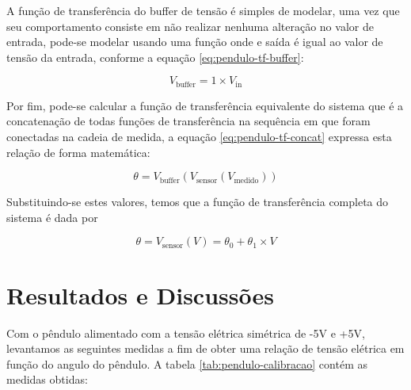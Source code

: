 \documentclass[12pt,a4paper]{instrumentacao}
\begin{document}
A função de transferência do buffer de tensão é simples de modelar, uma vez que seu comportamento consiste em não realizar nenhuma alteração no valor de entrada, pode-se modelar usando uma função onde e saída é igual ao valor de tensão da entrada, conforme a equação \ref{eq:pendulo-tf-buffer}:

\begin{equation}
	V_{\text{buffer}} = 1 \times V_{\text{in}}	
	\label{eq:pendulo-tf-buffer}
\end{equation}


Por fim, pode-se calcular a função de transferência equivalente do sistema que é a concatenação de todas funções de transferência na sequência em que foram conectadas na cadeia de medida, a equação \ref{eq:pendulo-tf-concat} expressa esta relação de forma matemática:

\begin{equation}
	\theta = V_{\text{buffer}}(V_{\text{sensor}}(V_{\text{medido}}))
	\label{eq:pendulo-tf-concat}
\end{equation}

Substituindo-se estes valores, temos que a função de transferência completa do sistema é dada por \label{eq:pendulo-tf-bloco}

\begin{equation}
	\theta = V_{\text{sensor}}(V) = \theta_0 + \theta_1 \times V
	\label{eq:pendulo-tf-bloco}
\end{equation}

\chapter{Resultados e Discussões}

Com o pêndulo alimentado com a tensão elétrica simétrica de -5V e +5V, levantamos as seguintes medidas a fim de obter uma relação de tensão elétrica em função do angulo do pêndulo. A tabela \ref{tab:pendulo-calibracao} contém as medidas obtidas:
\end{document}
